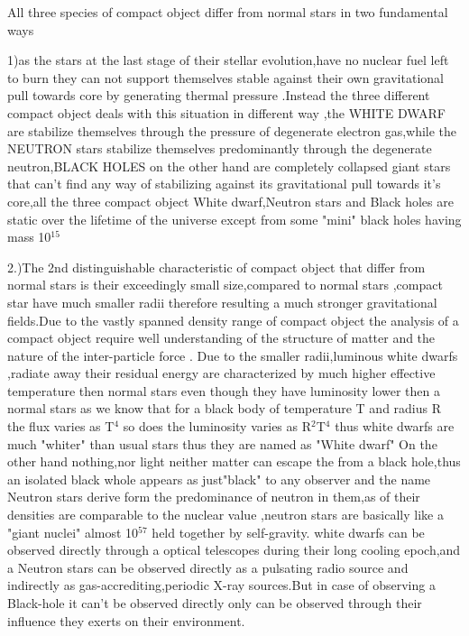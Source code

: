 \documentclass{report}
\begin{document}
All three species of compact object differ from normal stars in two fundamental ways
 
1)as the stars at the last stage of their stellar evolution,have no nuclear fuel left to burn they can not support themselves stable against their own gravitational pull towards core by generating thermal pressure .Instead the three different compact object deals with this situation in different way ,the WHITE DWARF are stabilize themselves through the pressure of degenerate electron gas,while the NEUTRON stars stabilize themselves predominantly through the degenerate neutron,BLACK HOLES on the other  hand are completely collapsed giant stars that can't find any way of stabilizing against its gravitational pull towards it's core,all the three compact object White dwarf,Neutron stars and Black holes are static over the lifetime of the universe except from some "mini" black holes having mass 10$^{15}$

2.)The 2nd distinguishable characteristic of compact object that differ from normal stars is their exceedingly small size,compared to normal stars ,compact star have much smaller radii therefore resulting a much stronger gravitational fields.Due to the vastly spanned density range of compact object the analysis of a compact object require well understanding of the structure of matter and the nature of the inter-particle force .
\newline
Due to the smaller radii,luminous white dwarfs ,radiate away their residual energy are characterized by much higher effective temperature then normal stars even though they have luminosity lower then a normal stars as we know that for a black body of temperature T and radius R the flux varies as T$^4$ so does the luminosity varies as R$^2$T$^4$ thus white dwarfs are much "whiter" than usual stars thus they are named as "White dwarf"
On the other hand nothing,nor light neither matter can escape the from a black hole,thus an isolated black whole appears as just"black" to any observer and the name Neutron stars derive form the predominance of neutron in them,as of their densities are comparable to the nuclear value ,neutron stars are basically like a "giant nuclei" almost 10$^{57}$ held together by self-gravity.
  white dwarfs can be observed directly through a optical telescopes during their long cooling epoch,and a Neutron stars can be observed directly as a pulsating radio source and indirectly as gas-accrediting,periodic X-ray sources.But in case of observing a Black-hole it can't be observed directly only can be observed through their influence they exerts on their environment. 
\newline
\end{document}
